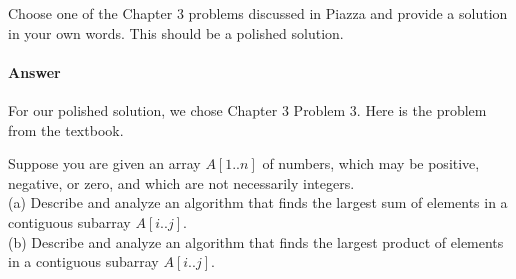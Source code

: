 \documentclass{article}
\begin{document}

\nextprob
{}

Choose one of the Chapter 3 problems discussed in Piazza and provide a solution
in your own words.  This should be a polished solution.

\paragraph{Answer}

For our polished solution, we chose Chapter 3 Problem 3.
Here is the problem from the textbook.

Suppose you are given an array $A[1 .. n]$ of numbers, which may be positive, negative, or zero, and which are not necessarily integers. \\
(a) Describe and analyze an algorithm that finds the largest sum of elements in a contiguous subarray $A[i .. j]$. \\
(b) Describe and analyze an algorithm that finds the largest product of elements in a contiguous subarray $A[i .. j]$.
\end{document}
